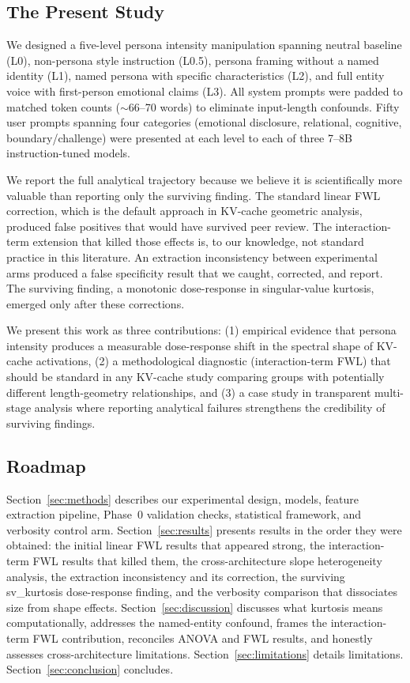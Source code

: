 \documentclass[11pt]{article}
\begin{document}
\subsection{The Present Study}
\label{sec:present-study}

We designed a five-level persona intensity manipulation spanning neutral baseline (L0), non-persona style instruction (L0.5), persona framing without a named identity (L1), named persona with specific characteristics (L2), and full entity voice with first-person emotional claims (L3). All system prompts were padded to matched token counts (${\sim}66$--70 words) to eliminate input-length confounds. Fifty user prompts spanning four categories (emotional disclosure, relational, cognitive, boundary/challenge) were presented at each level to each of three 7--8B instruction-tuned models.

We report the full analytical trajectory because we believe it is scientifically more valuable than reporting only the surviving finding. The standard linear FWL correction, which is the default approach in KV-cache geometric analysis, produced false positives that would have survived peer review. The interaction-term extension that killed those effects is, to our knowledge, not standard practice in this literature. An extraction inconsistency between experimental arms produced a false specificity result that we caught, corrected, and report. The surviving finding, a monotonic dose-response in singular-value kurtosis, emerged only after these corrections.

We present this work as three contributions: (1) empirical evidence that persona intensity produces a measurable dose-response shift in the spectral shape of KV-cache activations, (2) a methodological diagnostic (interaction-term FWL) that should be standard in any KV-cache study comparing groups with potentially different length-geometry relationships, and (3) a case study in transparent multi-stage analysis where reporting analytical failures strengthens the credibility of surviving findings.

\subsection{Roadmap}
\label{sec:roadmap}

Section~\ref{sec:methods} describes our experimental design, models, feature extraction pipeline, Phase~0 validation checks, statistical framework, and verbosity control arm. Section~\ref{sec:results} presents results in the order they were obtained: the initial linear FWL results that appeared strong, the interaction-term FWL results that killed them, the cross-architecture slope heterogeneity analysis, the extraction inconsistency and its correction, the surviving sv\_kurtosis dose-response finding, and the verbosity comparison that dissociates size from shape effects. Section~\ref{sec:discussion} discusses what kurtosis means computationally, addresses the named-entity confound, frames the interaction-term FWL contribution, reconciles ANOVA and FWL results, and honestly assesses cross-architecture limitations. Section~\ref{sec:limitations} details limitations. Section~\ref{sec:conclusion} concludes.
\end{document}
